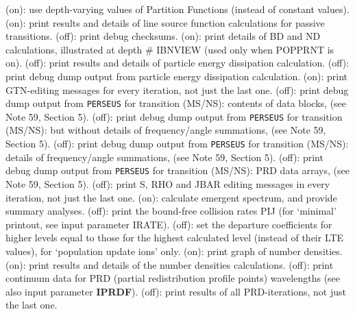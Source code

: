 \space \vbox { (on): \bang
use depth-varying values of Partition Functions (instead of constant values).}
\space \vbox { (on): \bang
print results and details of line source function calculations for passive
\break transitions.}
\space \vbox { (off): \bang
print debug checksums.}
\space \vbox { (on): \bang
print details of BD and ND calculations, illustrated at depth \# IBNVIEW
(used only when POPPRNT is on).}
\space \vbox { (off): \bang
print results and details of particle energy dissipation calculation.}
\space \vbox { (off): \bang
print debug dump output from particle energy dissipation calculation.}
\space \vbox { (on): \bang
print GTN-editing messages for every iteration, not just the last one.}
\space \vbox { (off): \bang
print debug dump output from {\tt PERSEUS} for transition (MS/NS):
contents of data blocks, (see Note 59, Section 5).}
\space \vbox { (off): \bang
print debug dump output from {\tt PERSEUS} for transition (MS/NS):
but without details of frequency/angle summations, (see Note 59, Section 5).}
\space \vbox { (off): \bang
print debug dump output from {\tt PERSEUS} for transition (MS/NS):
details of frequency/angle summations, (see Note 59, Section 5).}
\space \vbox { (off): \bang
print debug dump output from {\tt PERSEUS} for transition (MS/NS):
PRD data arrays, (see Note 59, Section 5).}
\space \vbox { (off): \bang
print S, RHO and JBAR editing messages in every iteration,
not just the last one.}
\space \vbox { (on): \bang
calculate emergent spectrum, and provide summary analyses.}
\space \vbox { (off): \bang 
print the bound-free collision rates PIJ (for `minimal' printout,
see input parameter IRATE).}
\space \vbox { (off): \bang
set the departure coefficients for higher levels equal to those for the
highest \break calculated level (instead of their LTE values), for `population
update ions' only.}
\space \vbox { (on): \bang
print graph of number densities.}
\space \vbox { (on): \bang
print results and details of the number densities calculations.}
\space \vbox { (off): \bang
print continuum data for PRD (partial redistribution profile points) 
\break wavelengths (see also input parameter {\bf IPRDF}).}
\space \vbox { (off): \bang
print results of all PRD-iterations, not just the last one.}

